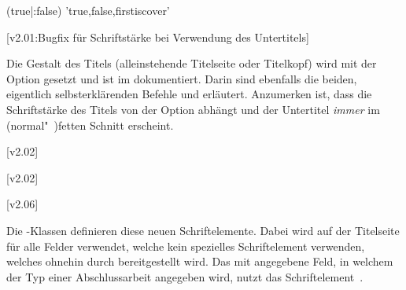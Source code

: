\begin{DeclareEntity*}{}
\begin{DeclareEntity*}{}
\begin{DeclareEntity*}{}
%
\begin{Entity}{}
\begin{Declaration}
  {}%
  (true|:false)
  'true,false,firstiscover'
\begin{Declaration}
  {}
\begin{Declaration}
  {}
  [v2.01:Bugfix für Schriftstärke bei Verwendung des Untertitels]
\printdeclarationlist

Die Gestalt des Titels (alleinstehende Titelseite oder Titelkopf) wird mit der 
Option  gesetzt und ist im \scrguide dokumentiert. Darin sind 
ebenfalls die beiden, eigentlich selbsterklärenden Befehle  und 
 erläutert. Anzumerken ist, dass die Schriftstärke des Titels 
von der Option  abhängt und der Untertitel \emph{immer} 
im (normal"~)fetten Schnitt erscheint. 
\end{Declaration}
\end{Declaration}
\end{Declaration}
\end{Entity}

\begin{Declaration}
  {}
  [v2.02]
\begin{Declaration}
  {}
  [v2.02]
\begin{Declaration}
  {}
  [v2.06]
\printdeclarationlist[Schriftelemente]

Die \TUDScript-Klassen definieren diese neuen Schriftelemente. Dabei wird 
 auf der Titelseite für alle Felder verwendet, welche kein 
spezielles Schriftelement verwenden, welches ohnehin durch \KOMAScript 
bereitgestellt wird. Das mit  angegebene Feld, in welchem der Typ 
einer Abschlussarbeit angegeben wird, nutzt das Schriftelement~. 


\end{Declaration}
\end{Declaration}
\end{Declaration}
\end{DeclareEntity*}
\end{DeclareEntity*}
\end{DeclareEntity*}
